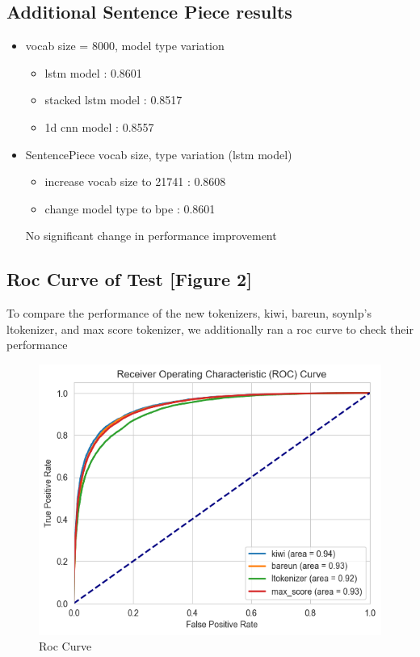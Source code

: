 \documentclass{article}
\begin{document}
\subsection{Additional Sentence Piece results}

\begin{itemize}
\item vocab size = 8000, model type variation
    \begin{itemize}
        \item lstm model : 0.8601
        \item stacked lstm model : 0.8517
        \item 1d cnn model : 0.8557
    \end{itemize}

\item SentencePiece vocab size, type variation (lstm model)
    \begin{itemize}
        \item increase vocab size to 21741 : 0.8608
        \item change model type to bpe : 0.8601
    \end{itemize}
No significant change in performance improvement

\end{itemize}

\subsection{Roc Curve of Test [Figure 2]}
To compare the performance of the new tokenizers, kiwi, bareun, soynlp's ltokenizer, and max score tokenizer, we additionally ran a roc curve to check their performance
\begin{figure}
    \centering
    \includegraphics[width=0.6\linewidth]{roc_curve.png}
    \caption{Roc Curve}
    \label{fig:enter-label}
\end{figure}
\end{document}
